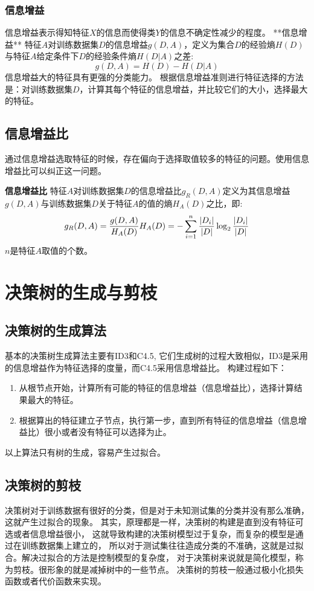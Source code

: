 \documentclass[a4paper,12pt]{book}
\begin{document}
    \subsubsection{信息增益}
    信息增益表示得知特征$X$的信息而使得类$Y$的信息不确定性减少的程度。
    **信息增益** 
    特征$A$对训练数据集$D$的信息增益$g(D,A)$，定义为集合$D$的经验熵$H(D)$与特征$A$给定条件下$D$的经验条件熵$H(D|A)$之差:
    $$
    g(D,A) = H(D) - H(D|A)
    $$
    信息增益大的特征具有更强的分类能力。
    根据信息增益准则进行特征选择的方法是：对训练数据集$D$，计算其每个特征的信息增益，并比较它们的大小，选择最大的特征。
    
    \subsection{信息增益比}
    
    通过信息增益选取特征的时候，存在偏向于选择取值较多的特征的问题。使用信息增益比可以纠正这一问题。
    
    \textbf{信息增益比}
    特征$A$对训练数据集$D$的信息增益比$g_R(D,A)$定义为其信息增益$g(D,A)$与训练数据集$D$关于特征$A$的值的熵$H_A(D)$之比，即:
    $$
    g_R(D,A) = \frac{g(D,A)}{H_A(D)} \\
    H_A(D) = -\sum_{i=1}^{n}\frac{|D_i|}{|D|} \log_2 \frac{|D_i|}{|D|}
    $$
    $n$是特征$A$取值的个数。

    \section{决策树的生成与剪枝}
    \subsection{决策树的生成算法}
    基本的决策树生成算法主要有ID3和C4.5, 它们生成树的过程大致相似，ID3是采用的信息增益作为特征选择的度量，而C4.5采用信息增益比。
    构建过程如下：
    \begin{enumerate}[itemindent=2em]
        \item 从根节点开始，计算所有可能的特征的信息增益（信息增益比），选择计算结果最大的特征。
        \item 根据算出的特征建立子节点，执行第一步，直到所有特征的信息增益（信息增益比）很小或者没有特征可以选择为止。
    \end{enumerate}

    以上算法只有树的生成，容易产生过拟合。

    \subsection{决策树的剪枝}
    决策树对于训练数据有很好的分类，但是对于未知测试集的分类并没有那么准确，这就产生过拟合的现象。
    其实，原理都是一样，决策树的构建是直到没有特征可选或者信息增益很小，
    这就导致构建的决策树模型过于复杂，而复杂的模型是通过在训练数据集上建立的，
    所以对于测试集往往造成分类的不准确，这就是过拟合。解决过拟合的方法是控制模型的复杂度，
    对于决策树来说就是简化模型，称为剪枝。很形象的就是减掉树中的一些节点。
    决策树的剪枝一般通过极小化损失函数或者代价函数来实现。
\end{document}
